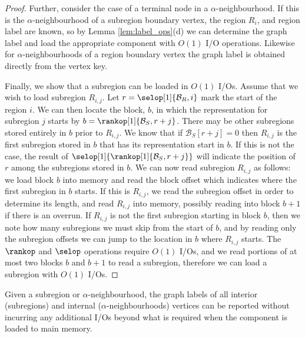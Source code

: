 {\begin{proof}
  Further, consider the case of a terminal node in a
  $\alpha$-neighbourhood. If this is the $\alpha$-neighbourhood of a
  subregion boundary vertex, the region $R_i$, and region label are
  known, so by Lemma \ref{lem:label_ops}(d) we can determine the graph
  label and load the appropriate component with $O(1)$ I/O
  operations. 
  Likewise for $\alpha$-neighbourhoods of a region
  boundary vertex the graph label is obtained directly from the vertex
  key.

  Finally, we show that a subregion can be loaded in $O(1)$
  I/Os. 
  Assume that  we wish to load subregion $R_{i,j}$. 
  Let $r = \selop[1]{\mathcal{B}_R,i}$ mark the start of the region $i$. 
  We can then locate the block, $b$, in which the representation for
  subregion $j$ starts by $b=\rankop[1]{\mathcal{B}_S, r+j}$. 
  There may be other subregions stored entirely in $b$ prior to
  $R_{i,j}$. 
  We know that if $\mathcal{B}_S[r+j] = 0$ then $R_{i,j}$ is the
  first subregion stored in $b$ that has its representation start in
  $b$.  
  If this is not the case, the result of
  $\selop[1]{\rankop[1]{\mathcal{B}_S,r+j}}$ will indicate the position
  of $r$ among the subregions stored in $b$.  
  We can now read
  subregion $R_{i,j}$ as follows: 
  we load block $b$ into memory and
  read the block offset which indicates where the first subregion in
  $b$ starts. 
  If this is $R_{i,j}$, we read the subregion offset in order to
  determine its length, and read $R_{i,j}$ into memory, possibly
  reading into block $b+1$ if there is an overrun. 
  If $R_{i,j}$ is not
  the first subregion starting in block $b$, then we note how many
  subregions we must skip from the start of $b$, and by reading only
  the subregion offsets we can jump to the location in $b$ where
  $R_{i,j}$ starts. 
  The $\rankop$ and $\selop$ operations require
  $O(1)$ I/Os, and we read portions of at most two blocks $b$ and
  $b+1$ to read a subregion, therefore we can load a subregion with $O(1)$
  I/Os.
\end{proof}


\begin{lemma}
  \label{lem:report_int_labels}
  Given a subregion or $\alpha$-neighbourhood, the graph labels of
  all interior (subregions) and internal ($\alpha$-neighbourhoods)
  vertices can be reported without incurring any additional I/Os
  beyond what is required when the component is loaded to main memory.
\end{lemma}

}
